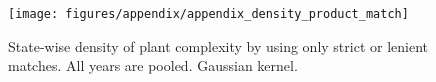 \documentclass[11pt]{article}
\begin{document}
\begin{appendices}
\begin{figure}[htpb]
	\centering
	\texttt{[image: figures/appendix/appendix\_density\_product\_match]}
	\caption{State-wise density of plant complexity by using only strict or lenient matches. All years are pooled. Gaussian kernel.}%
	\label{fig:density_product_match}
\end{figure}











\newpage 
\end{appendices}
\end{document}
